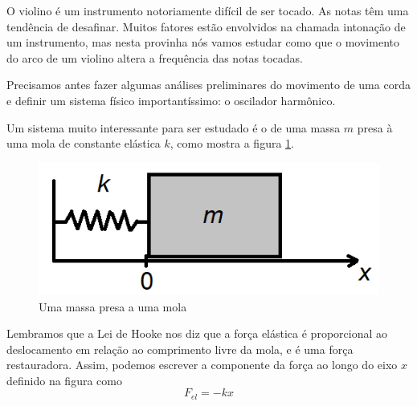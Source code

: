 \documentclass[]{IMTexam}
\author{Isabella B.}
\date{}
\begin{document}
\maketitle

O violino é um instrumento notoriamente difícil de ser tocado. As notas têm uma tendência de desafinar. Muitos fatores estão envolvidos na chamada intonação de um instrumento, mas nesta provinha nós vamos estudar como que o movimento do arco de um violino altera a frequência das notas tocadas.

Precisamos antes fazer algumas análises preliminares do movimento de uma corda e definir um sistema físico importantíssimo: o oscilador harmônico.

\bigskip

\begin{questions}

	 \label{ques:q1}
	Um sistema muito interessante para ser estudado é o de uma massa $ m $ presa à uma mola de constante elástica $ k $, como mostra a figura \ref{fig:fig1}.

	\begin{figure}[H]
		\centering
		\includegraphics[width=0.5\linewidth]{screenshot001}
		\caption{Uma massa presa a uma mola}
		\label{fig:fig1}
	\end{figure}

	Lembramos que a Lei de Hooke nos diz que a força elástica é proporcional ao deslocamento em relação ao comprimento livre da mola, e é uma força restauradora. Assim, podemos escrever a componente da força ao longo do eixo $ x $ definido na figura como
	\begin{equation}\label{eq:eqFel}
		F_{el} = -kx
	\end{equation}

\end{questions}
\end{document}
